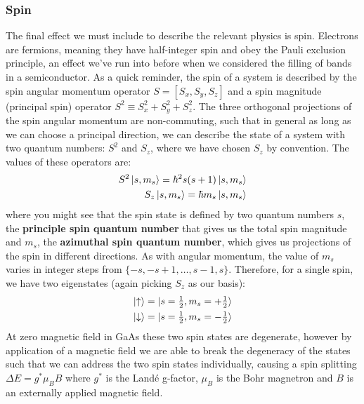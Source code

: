 \subsubsection{Spin}
The final effect we must include to describe the relevant physics is spin. Electrons are fermions, meaning
they have half-integer spin and obey the Pauli exclusion principle, an effect we've run into before when we considered
the filling of bands in a semiconductor. As a quick reminder, the spin of a system is described by the spin angular momentum operator
$S = [S_x, S_y, S_z]$ and a spin magnitude (principal spin) operator $S^2 \equiv S_x^2 + S_y^2 + S_z^2$. The three orthogonal projections of the spin
angular momentum are non-commuting, such that in general as long as we can choose a principal direction, we can describe the
state of a system with two quantum numbers: $S^2$ and $S_z$, where we have chosen $S_z$ by convention. The values of these operators
are:
\begin{eqnarray}
  S^2\ket{s, m_s} = \hbar^2s(s + 1)\ket{s, m_s} \\
  S_z\ket{s, m_s} = \hbar m_s\ket{s, m_s}
\end{eqnarray}
where you might see that the spin state is defined by two quantum numbers $s$, the \textbf{principle spin quantum number} that gives
us the total spin magnitude and $m_s$, the \textbf{azimuthal spin quantum number}, which gives us projections of the spin in different directions.
As with angular momentum, the value of $m_s$ varies in integer steps from $\{-s, -s+1, \dots, s-1, s\}$. Therefore, for a single spin, we have two
eigenstates (again picking $S_z$ as our basis):
\begin{eqnarray}
  \ket{\uparrow} &= \ket{s = \tfrac{1}{2}, m_s = +\tfrac{1}{2}} \\
  \ket{\downarrow} &= \ket{s = \tfrac{1}{2}, m_s = -\tfrac{1}{2}}
\end{eqnarray}
At zero magnetic field in GaAs these two spin states are degenerate, however by application of a magnetic
field we are able to break the degeneracy of the states such that we can address the two spin states individually,
causing a spin splitting $\Delta E = g^* \mu_B B$ where $g^*$ is the Landé g-factor, $\mu_B$ is the Bohr
magnetron and $B$ is an externally applied magnetic field.

